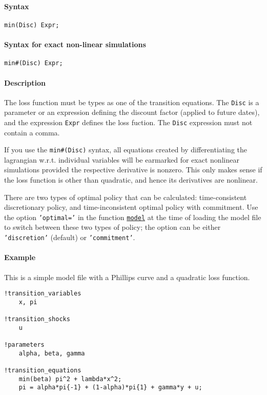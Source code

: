 


	\paragraph{Syntax}

\begin{verbatim}
min(Disc) Expr;
\end{verbatim}

\paragraph{Syntax for exact non-linear
simulations}

\begin{verbatim}
min#(Disc) Expr;
\end{verbatim}

\paragraph{Description}

The loss function must be types as one of the transition equations. The
\texttt{Disc} is a parameter or an expression defining the discount
factor (applied to future dates), and the expression \texttt{Expr}
defines the loss fuction. The \texttt{Disc} expression must not contain
a comma.

If you use the \texttt{min\#(Disc)} syntax, all equations created by
differentiating the lagrangian w.r.t. individual variables will be
earmarked for exact nonlinear simulations provided the respective
derivative is nonzero. This only makes sense if the loss function is
other than quadratic, and hence its derivatives are nonlinear.

There are two types of optimal policy that can be calculated:
time-consistent discretionary policy, and time-inconsistent optimal
policy with commitment. Use the option \texttt{'optimal='} in the
function \href{model/model}{\texttt{model}} at the time of loading the
model file to switch between these two types of policy; the option can
be either \texttt{'discretion'} (default) or \texttt{'commitment'}.

\paragraph{Example}

This is a simple model file with a Phillips curve and a quadratic loss
function.

\begin{verbatim}
!transition_variables
    x, pi

!transition_shocks
    u

!parameters
    alpha, beta, gamma

!transition_equations
    min(beta) pi^2 + lambda*x^2;
    pi = alpha*pi{-1} + (1-alpha)*pi{1} + gamma*y + u;
\end{verbatim}


